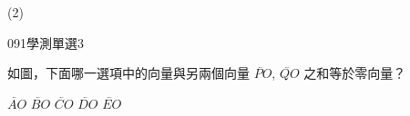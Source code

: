 \begin{QUESTIONS}
\begin{QUESTION}
\begin{QBODY}
\begin{QOPS}
            \end{QOPS}
        \end{QBODY}
        \begin{QFROMS}
        \end{QFROMS}
        \begin{QTAGS}\end{QTAGS}
        \begin{QANS}
            (2)
        \end{QANS}
        \begin{QSOLLIST}
        \end{QSOLLIST}
        \begin{QEMPTYSPACE}
        \end{QEMPTYSPACE}
    \end{QUESTION}
    \begin{QUESTION}
        \begin{ExamInfo}{091}{學測}{單選}{3}
        \end{ExamInfo}
        \begin{ExamAnsRateInfo}{62}{94}{65}{27}
        \end{ExamAnsRateInfo}
        \begin{QBODY}
            如圖，下面哪一選項中的向量與另兩個向量 $\lvec{PO}$, $\lvec{QO}$ 之和等於零向量？
            \begin{QOPS} 
                \QOP $\lvec{AO}$ 
                \QOP $\lvec{BO}$ 
                \QOP $\lvec{CO}$ 
                \QOP $\lvec{DO}$ 
                \QOP $\lvec{EO}$ 
            \end{QOPS}



\end{QBODY}
\end{QUESTION}
\end{QUESTIONS}
